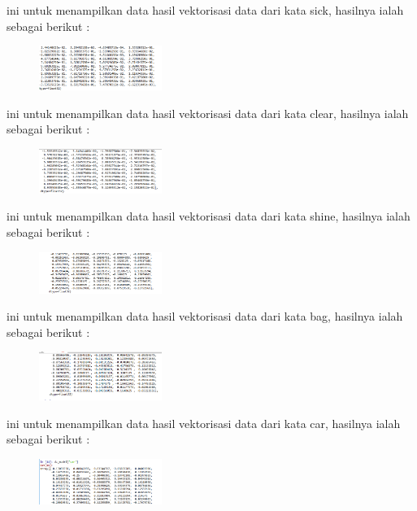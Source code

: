 \begin{enumerate}
	\hfill\break
	
	ini untuk menampilkan data hasil vektorisasi data dari kata sick, hasilnya ialah sebagai berikut : 
	\begin{figure}[H]
	\centering
		\includegraphics[width=4cm]{figures/1174095/tugas5/h5.PNG}
	\end{figure}

	\hfill\break
	
	ini untuk menampilkan data hasil vektorisasi data dari kata clear, hasilnya ialah sebagai berikut : 
	\begin{figure}[H]
	\centering
		\includegraphics[width=4cm]{figures/1174095/tugas5/h6.PNG}
	\end{figure}

	\hfill\break
	
	ini untuk menampilkan data hasil vektorisasi data dari kata shine, hasilnya ialah sebagai berikut : 
	\begin{figure}[H]
	\centering
		\includegraphics[width=4cm]{figures/1174095/tugas5/h7.PNG}
	\end{figure}

	\hfill\break
	
	ini untuk menampilkan data hasil vektorisasi data dari kata bag, hasilnya ialah sebagai berikut : 
	\begin{figure}[H]
	\centering
		\includegraphics[width=4cm]{figures/1174095/tugas5/h8.PNG}
	\end{figure}

	\hfill\break
	
	ini untuk menampilkan data hasil vektorisasi data dari kata car, hasilnya ialah sebagai berikut : 
	\begin{figure}[H]
	\centering
		\includegraphics[width=4cm]{figures/1174095/tugas5/h9.PNG}
	\end{figure}


\end{enumerate}
